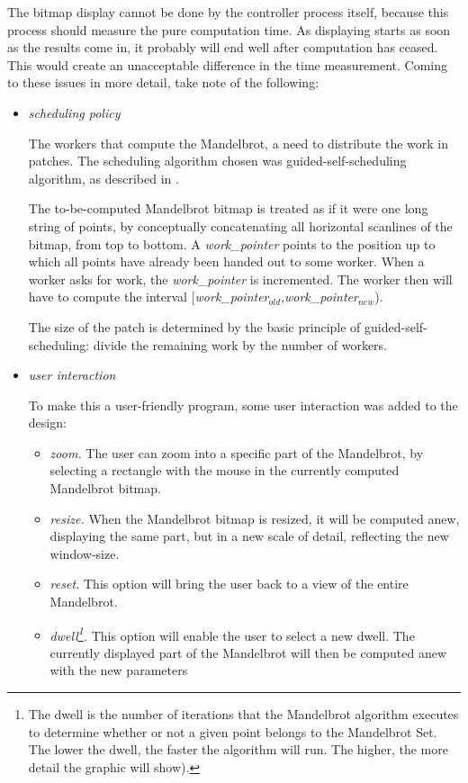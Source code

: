 The bitmap display cannot be done by the controller process 
itself, because this process should measure the pure computation time. As 
displaying starts as soon as the results come in, it probably will end well
after computation has ceased. This would create an unacceptable 
difference in the time measurement. 
\Skip
Coming to these issues in more detail, take note of the following:
\begin{itemize}
\item {\em scheduling policy}

The workers that compute the Mandelbrot, a need to distribute
the work in patches. The scheduling algorithm chosen was guided-self-scheduling
algorithm, as described in \cite{gss}.

The to-be-computed Mandelbrot bitmap is treated as if it were one long string
of points, by conceptually concatenating all horizontal scanlines of the 
bitmap, from top to bottom. A {\em work\_pointer} points to the position up 
to which all points have already been handed out to some worker. When a
worker asks for work, the {\em work\_pointer} is incremented. The worker then 
will have to compute the interval  
[{\em work\_pointer}$_{old}$,{\em work\_pointer}$_{new}$).

The size of the patch is determined by the
basic principle of guided-self-scheduling: divide the remaining work by the
number of workers.  

\item {\em user interaction}

To make this a user-friendly program, some user interaction was added
to the design:
\begin{itemize}
\item {\em zoom. } 
The user can zoom into a specific part of the Mandelbrot, by selecting a
rectangle with the mouse in the currently computed Mandelbrot bitmap. 
\item {\em resize. } 
When the Mandelbrot bitmap is resized, it will be computed anew, displaying
the same part, but in a new scale of detail, reflecting the new window-size.
\item {\em reset. } 
This option will bring the user back to a view of the entire Mandelbrot.
\item {\em dwell\footnote{The dwell is the number of iterations that
the Mandelbrot algorithm executes to determine whether or not a given point
belongs to the Mandelbrot Set. The lower the dwell, the faster the 
algorithm will run. The higher, the more detail the graphic will show).}.} 
This option will enable the user to select a new dwell. The currently
displayed part of the Mandelbrot will then be computed anew with the new 
parameters
\end{itemize}


\end{itemize}
